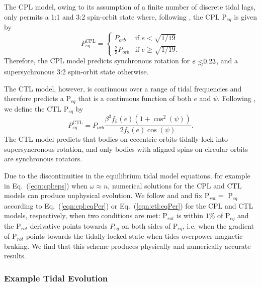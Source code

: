 \documentclass[twocolumn]{aastex61}
\def\lsim{~\rlap{$<$}{\lower 1.0ex\hbox{$\sim$}}}
\begin{document}
The CPL model, owing to its assumption of a finite number of discrete tidal lags, only permits a 1:1 and 3:2 spin-orbit state where, following \citet{Barnes2017}, the CPL P$_{eq}$ is given by
\begin{equation} \label{eqn:cpl:eqPer}
P^{\mathrm{CPL}}_{eq} = 
\begin{cases}
P_{orb} & \text{if } e < \sqrt{1/19}\\
\frac{2}{3}P_{orb} & \text{if } e \geq \sqrt{1/19}.
\end{cases}
\end{equation}
Therefore, the CPL model predicts synchronous rotation for $e \lsim 0.23$, and a supersychronous 3:2 spin-orbit state otherwise.

The CTL model, however, is continuous over a range of tidal frequencies and therefore predicts a P$_{eq}$ that is a continuous function of both $e$ and $\psi$.  Following \citet{Barnes2017}, we define the CTL P$_{eq}$ by
\begin{equation} \label{eqn:ctl:eqPer}
P^{\mathrm{CTL}}_{eq} = P_{orb} \frac{\beta^3 f_5(e) (1 + \cos^2(\psi))}{2f_2(e) \cos(\psi)}.
\end{equation}
The CTL model predicts that bodies on eccentric orbits tidally-lock into supersyncronous rotation, and only bodies with aligned spins on circular orbits are synchronous rotators. 

Due to the discontinuities in the equilibrium tidal model equations, for example in Eq.~(\ref{eqn:cpl:eps}) when $\omega \approx n$, numerical solutions for the CPL and CTL models can produce unphysical evolution. We follow \citet{Barnes2013} and \citet{Fleming2018} and fix P$_{rot} = $ P$_{eq}$ according to Eq.~(\ref{eqn:cpl:eqPer}) or Eq.~(\ref{eqn:ctl:eqPer}) for the CPL and CTL models, respectively, when two conditions are met: P$_{rot}$ is within $1\%$ of P$_{eq}$ and the P$_{rot}$ derivative points towards $P_{eq}$ on both sides of P$_{eq}$, i.e. when the gradient of P$_{rot}$ points towards the tidally-locked state when tides overpower magnetic braking. We find that this scheme produces physically and numerically accurate results. 

\subsubsection{Example Tidal Evolution} \label{sec:methods:eqtideExample}
\end{document}
